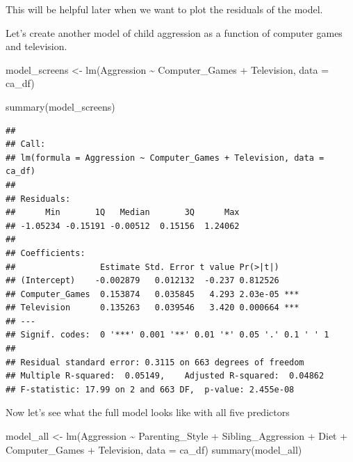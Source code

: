 \documentclass[
]{book}
\newenvironment{Shaded}{\begin{snugshade}}{\end{snugshade}}
\newcommand{\AttributeTok}[1]{\textcolor[rgb]{0.77,0.63,0.00}{#1}}
\newcommand{\FunctionTok}[1]{\textcolor[rgb]{0.00,0.00,0.00}{#1}}
\newcommand{\NormalTok}[1]{#1}
\newcommand{\OtherTok}[1]{\textcolor[rgb]{0.56,0.35,0.01}{#1}}
\newcommand{\SpecialCharTok}[1]{\textcolor[rgb]{0.00,0.00,0.00}{#1}}
\begin{document}
This will be helpful later when we want to plot the residuals of the model.

Let's create another model of child aggression as a function of computer games and television.

\begin{Shaded}
\begin{Highlighting}[]
\NormalTok{model\_screens }\OtherTok{\textless{}{-}} \FunctionTok{lm}\NormalTok{(Aggression }\SpecialCharTok{\textasciitilde{}}\NormalTok{ Computer\_Games }\SpecialCharTok{+}\NormalTok{ Television, }\AttributeTok{data =}\NormalTok{ ca\_df)}

\FunctionTok{summary}\NormalTok{(model\_screens)}
\end{Highlighting}
\end{Shaded}

\begin{verbatim}
## 
## Call:
## lm(formula = Aggression ~ Computer_Games + Television, data = ca_df)
## 
## Residuals:
##      Min       1Q   Median       3Q      Max 
## -1.05234 -0.15191 -0.00512  0.15156  1.24062 
## 
## Coefficients:
##                 Estimate Std. Error t value Pr(>|t|)    
## (Intercept)    -0.002879   0.012132  -0.237 0.812526    
## Computer_Games  0.153874   0.035845   4.293 2.03e-05 ***
## Television      0.135263   0.039546   3.420 0.000664 ***
## ---
## Signif. codes:  0 '***' 0.001 '**' 0.01 '*' 0.05 '.' 0.1 ' ' 1
## 
## Residual standard error: 0.3115 on 663 degrees of freedom
## Multiple R-squared:  0.05149,    Adjusted R-squared:  0.04862 
## F-statistic: 17.99 on 2 and 663 DF,  p-value: 2.455e-08
\end{verbatim}

Now let's see what the full model looks like with all five predictors

\begin{Shaded}
\begin{Highlighting}[]
\NormalTok{model\_all }\OtherTok{\textless{}{-}} \FunctionTok{lm}\NormalTok{(Aggression }\SpecialCharTok{\textasciitilde{}}\NormalTok{ Parenting\_Style }\SpecialCharTok{+}\NormalTok{ Sibling\_Aggression }\SpecialCharTok{+}\NormalTok{ Diet }\SpecialCharTok{+}\NormalTok{ Computer\_Games }\SpecialCharTok{+}\NormalTok{ Television, }
                \AttributeTok{data =}\NormalTok{ ca\_df)}
\FunctionTok{summary}\NormalTok{(model\_all)}
\end{Highlighting}
\end{Shaded}
\end{document}
